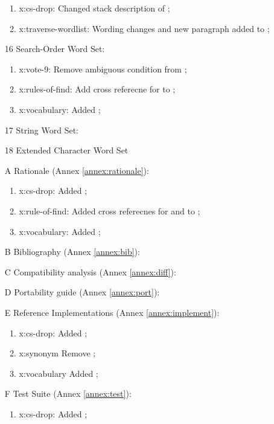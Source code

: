 \begin{itemize}
\begin{enumerate}
		\item \textsf{x:cs-drop}: Changed stack description of ;
		\item \textsf{x:traverse-wordlist}: Wording changes and new paragraph added
			to ;
		\end{enumerate}
	\item[16] Search-Order Word Set:		%
		\begin{enumerate}
		\item \textsf{x:vote-9}: Remove ambiguous condition from
			;
		\item \textsf{x:rules-of-find}: Add cross referecne for
			 to ;
		\item \textsf{x:vocabulary}: Added ;
		\end{enumerate}
	\item[17] String Word Set:				%
	\item[18] Extended Character Word Set	%
	\item[A] Rationale (Annex \ref{annex:rationale}):	%
		\begin{enumerate}
		\item \textsf{x:cs-drop}: Added ;
		\item \textsf{x:rule-of-find}: Added cross referecnes for
			 and  to
			;
		\item \textsf{x:vocabulary}: Added ;
		\end{enumerate}
	\item[B] Bibliography (Annex \ref{annex:bib}):		%
	\item[C] Compatibility analysis (Annex \ref{annex:diff}):	%
	\item[D] Portability guide (Annex \ref{annex:port}):		%
	\item[E] Reference Implementations (Annex \ref{annex:implement}): %
		\begin{enumerate}
		\item \textsf{x:cs-drop}: Added ;
		\item \textsf{x:synonym} Remove ; %
		\item \textsf{x:vocabulary} Added ;
		\end{enumerate}
	\item[F] Test Suite (Annex \ref{annex:test}):	%
		\begin{enumerate}
		\item \textsf{x:cs-drop}: Added ;
		\end{enumerate}
	\end{itemize}

